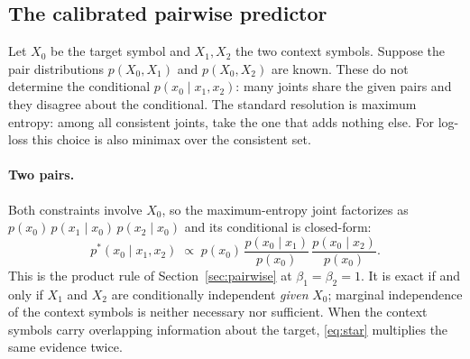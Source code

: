 \documentclass[11pt]{article}
\begin{document}
\subsection{The calibrated pairwise predictor}
\label{sec:calibration}

Let $X_0$ be the target symbol and $X_1, X_2$ the two context
symbols.  Suppose the pair distributions $p(X_0, X_1)$ and
$p(X_0, X_2)$ are known.  These do not determine the conditional
$p(x_0 \mid x_1, x_2)$: many joints share the given pairs and they
disagree about the conditional.  The standard resolution is maximum
entropy: among all consistent joints, take the one that adds nothing
else.  For log-loss this choice is also minimax over the consistent
set.

\paragraph{Two pairs.}  Both constraints involve $X_0$, so the
maximum-entropy joint factorizes as
$p(x_0)\,p(x_1 \mid x_0)\,p(x_2 \mid x_0)$ and its conditional is
closed-form:
\begin{equation}
\label{eq:star}
  p^\ast(x_0 \mid x_1, x_2)
  \;\propto\;
  p(x_0)\,
  \frac{p(x_0 \mid x_1)}{p(x_0)}\,
  \frac{p(x_0 \mid x_2)}{p(x_0)}.
\end{equation}
This is the product rule of Section~\ref{sec:pairwise} at
$\beta_1 = \beta_2 = 1$.  It is exact if and only if $X_1$ and $X_2$
are conditionally independent \emph{given} $X_0$; marginal
independence of the context symbols is neither necessary nor
sufficient.  When the context symbols carry overlapping information
about the target, \eqref{eq:star} multiplies the same evidence twice.
\end{document}
